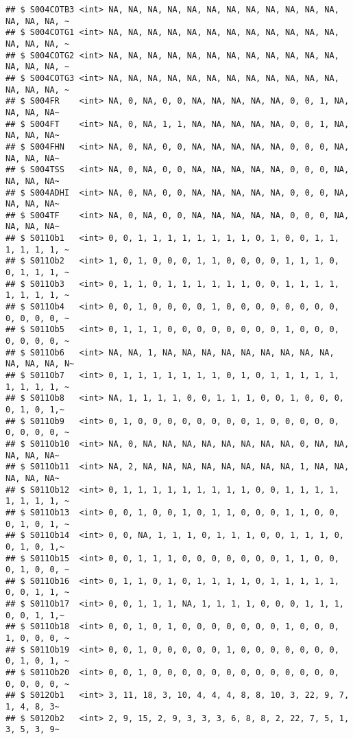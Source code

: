 \documentclass[
]{article}
\begin{document}
\begin{verbatim}
## $ S004COTB3 <int> NA, NA, NA, NA, NA, NA, NA, NA, NA, NA, NA, NA, NA, NA, NA, ~
## $ S004COTG1 <int> NA, NA, NA, NA, NA, NA, NA, NA, NA, NA, NA, NA, NA, NA, NA, ~
## $ S004COTG2 <int> NA, NA, NA, NA, NA, NA, NA, NA, NA, NA, NA, NA, NA, NA, NA, ~
## $ S004COTG3 <int> NA, NA, NA, NA, NA, NA, NA, NA, NA, NA, NA, NA, NA, NA, NA, ~
## $ S004FR    <int> NA, 0, NA, 0, 0, NA, NA, NA, NA, NA, 0, 0, 1, NA, NA, NA, NA~
## $ S004FT    <int> NA, 0, NA, 1, 1, NA, NA, NA, NA, NA, 0, 0, 1, NA, NA, NA, NA~
## $ S004FHN   <int> NA, 0, NA, 0, 0, NA, NA, NA, NA, NA, 0, 0, 0, NA, NA, NA, NA~
## $ S004TSS   <int> NA, 0, NA, 0, 0, NA, NA, NA, NA, NA, 0, 0, 0, NA, NA, NA, NA~
## $ S004ADHI  <int> NA, 0, NA, 0, 0, NA, NA, NA, NA, NA, 0, 0, 0, NA, NA, NA, NA~
## $ S004TF    <int> NA, 0, NA, 0, 0, NA, NA, NA, NA, NA, 0, 0, 0, NA, NA, NA, NA~
## $ S011Ob1   <int> 0, 0, 1, 1, 1, 1, 1, 1, 1, 1, 0, 1, 0, 0, 1, 1, 1, 1, 1, 1, ~
## $ S011Ob2   <int> 1, 0, 1, 0, 0, 0, 1, 1, 0, 0, 0, 0, 1, 1, 1, 0, 0, 1, 1, 1, ~
## $ S011Ob3   <int> 0, 1, 1, 0, 1, 1, 1, 1, 1, 1, 0, 0, 1, 1, 1, 1, 1, 1, 1, 1, ~
## $ S011Ob4   <int> 0, 0, 1, 0, 0, 0, 0, 1, 0, 0, 0, 0, 0, 0, 0, 0, 0, 0, 0, 0, ~
## $ S011Ob5   <int> 0, 1, 1, 1, 0, 0, 0, 0, 0, 0, 0, 0, 1, 0, 0, 0, 0, 0, 0, 0, ~
## $ S011Ob6   <int> NA, NA, 1, NA, NA, NA, NA, NA, NA, NA, NA, NA, NA, NA, NA, N~
## $ S011Ob7   <int> 0, 1, 1, 1, 1, 1, 1, 1, 0, 1, 0, 1, 1, 1, 1, 1, 1, 1, 1, 1, ~
## $ S011Ob8   <int> NA, 1, 1, 1, 1, 0, 0, 1, 1, 1, 0, 0, 1, 0, 0, 0, 0, 1, 0, 1,~
## $ S011Ob9   <int> 0, 1, 0, 0, 0, 0, 0, 0, 0, 0, 1, 0, 0, 0, 0, 0, 0, 0, 0, 0, ~
## $ S011Ob10  <int> NA, 0, NA, NA, NA, NA, NA, NA, NA, NA, 0, NA, NA, NA, NA, NA~
## $ S011Ob11  <int> NA, 2, NA, NA, NA, NA, NA, NA, NA, NA, 1, NA, NA, NA, NA, NA~
## $ S011Ob12  <int> 0, 1, 1, 1, 1, 1, 1, 1, 1, 1, 0, 0, 1, 1, 1, 1, 1, 1, 1, 1, ~
## $ S011Ob13  <int> 0, 0, 1, 0, 0, 1, 0, 1, 1, 0, 0, 0, 1, 1, 0, 0, 0, 1, 0, 1, ~
## $ S011Ob14  <int> 0, 0, NA, 1, 1, 1, 0, 1, 1, 1, 0, 0, 1, 1, 1, 0, 0, 1, 0, 1,~
## $ S011Ob15  <int> 0, 0, 1, 1, 1, 0, 0, 0, 0, 0, 0, 0, 1, 1, 0, 0, 0, 1, 0, 0, ~
## $ S011Ob16  <int> 0, 1, 1, 0, 1, 0, 1, 1, 1, 1, 0, 1, 1, 1, 1, 1, 0, 0, 1, 1, ~
## $ S011Ob17  <int> 0, 0, 1, 1, 1, NA, 1, 1, 1, 1, 0, 0, 0, 1, 1, 1, 0, 0, 1, 1,~
## $ S011Ob18  <int> 0, 0, 1, 0, 1, 0, 0, 0, 0, 0, 0, 0, 1, 0, 0, 0, 1, 0, 0, 0, ~
## $ S011Ob19  <int> 0, 0, 1, 0, 0, 0, 0, 0, 1, 0, 0, 0, 0, 0, 0, 0, 0, 1, 0, 1, ~
## $ S011Ob20  <int> 0, 0, 1, 0, 0, 0, 0, 0, 0, 0, 0, 0, 0, 0, 0, 0, 0, 0, 0, 0, ~
## $ S012Ob1   <int> 3, 11, 18, 3, 10, 4, 4, 4, 8, 8, 10, 3, 22, 9, 7, 1, 4, 8, 3~
## $ S012Ob2   <int> 2, 9, 15, 2, 9, 3, 3, 3, 6, 8, 8, 2, 22, 7, 5, 1, 3, 5, 3, 9~

\end{verbatim}
\end{document}
